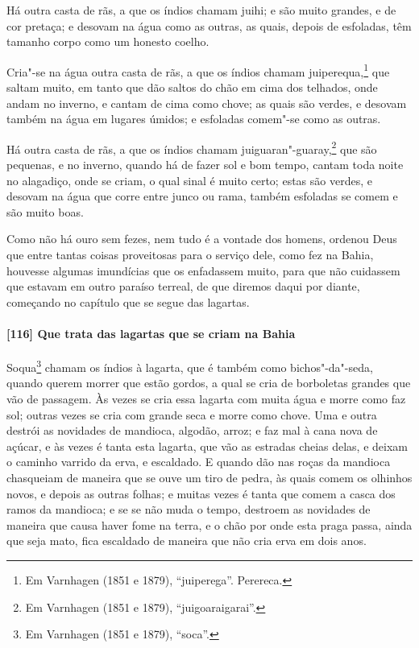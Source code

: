 \begin{linenumbers}
Há outra casta de rãs, a que os índios chamam juihi; e são muito grandes, e de cor
pretaça; e desovam na água como as outras, as quais, depois de esfoladas, têm tamanho
corpo como um honesto coelho.

Cria"-se na água outra casta de rãs, a que os índios chamam juiperequa,\footnote{ Em
Varnhagen (1851 e 1879), ``juiperega''. Perereca.} que saltam muito, em tanto que dão
saltos do chão em cima dos telhados, onde andam no inverno, e cantam de cima como chove;
as quais são verdes, e desovam também na água em lugares úmidos; e esfoladas comem"-se como
as outras.

Há outra casta de rãs, a que os índios chamam juiguaran"-guaray,\footnote{ Em Varnhagen
(1851 e 1879), ``juigoaraigarai''.} que são pequenas, e no inverno, quando há de fazer
sol e bom tempo, cantam toda noite no alagadiço, onde se criam, o qual sinal é muito
certo; estas são verdes, e desovam na água que corre entre junco ou rama, também esfoladas
se comem e são muito boas.

Como não há ouro sem fezes, nem tudo é a vontade dos homens, ordenou Deus que entre tantas
coisas proveitosas para o serviço dele, como fez na Bahia, houvesse algumas imundícias que
os enfadassem muito, para que não cuidassem que estavam em outro paraíso terreal, de que
diremos daqui por diante, começando no capítulo que se segue das lagartas.

\paragraph{[116] Que trata das lagartas que se criam na Bahia}\quad
Soqua\footnote{ Em Varnhagen (1851 e 1879), ``soca''.} chamam os índios à lagarta, que é
também como bichos"-da"-seda, quando querem morrer que estão gordos, a qual se cria de
borboletas grandes que vão de passagem. Às vezes se cria essa lagarta com muita água e
morre como faz sol; outras vezes se cria com grande seca e morre como chove. Uma e outra
destrói as novidades de mandioca, algodão, arroz; e faz mal à cana nova de açúcar, e às
vezes é tanta esta lagarta, que vão as estradas cheias delas, e deixam o caminho varrido
da erva, e escaldado. E quando dão nas roças da mandioca chasqueiam de maneira que se ouve
um tiro de pedra, às quais comem os olhinhos novos, e depois as outras folhas; e muitas
vezes é tanta que comem a casca dos ramos da mandioca; e se se não muda o tempo, destroem
as novidades de maneira que causa haver fome na terra, e o chão por onde esta praga passa,
ainda que seja mato, fica escaldado de maneira que não cria erva em dois anos.


\end{linenumbers}
